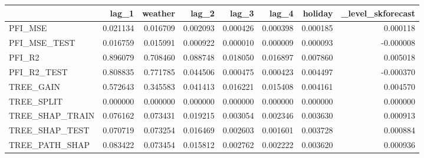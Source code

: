 \begin{tabular}{lrrrrrrr}
\toprule
 & lag_1 & weather & lag_2 & lag_3 & lag_4 & holiday & _level_skforecast \\
\midrule
PFI_MSE & 0.021134 & 0.016709 & 0.002093 & 0.000426 & 0.000398 & 0.000185 & 0.000118 \\
PFI_MSE_TEST & 0.016759 & 0.015991 & 0.000922 & 0.000010 & 0.000009 & 0.000093 & -0.000008 \\
PFI_R2 & 0.896079 & 0.708460 & 0.088748 & 0.018050 & 0.016897 & 0.007860 & 0.005018 \\
PFI_R2_TEST & 0.808835 & 0.771785 & 0.044506 & 0.000475 & 0.000423 & 0.004497 & -0.000370 \\
TREE_GAIN & 0.572643 & 0.345583 & 0.041413 & 0.016221 & 0.015408 & 0.004161 & 0.004570 \\
TREE_SPLIT & 0.000000 & 0.000000 & 0.000000 & 0.000000 & 0.000000 & 0.000000 & 0.000000 \\
TREE_SHAP_TRAIN & 0.076162 & 0.073431 & 0.019215 & 0.003054 & 0.002346 & 0.003630 & 0.000913 \\
TREE_SHAP_TEST & 0.070719 & 0.073254 & 0.016469 & 0.002603 & 0.001601 & 0.003728 & 0.000884 \\
TREE_PATH_SHAP & 0.083422 & 0.073454 & 0.015812 & 0.002762 & 0.002222 & 0.003620 & 0.000936 \\
\bottomrule
\end{tabular}
